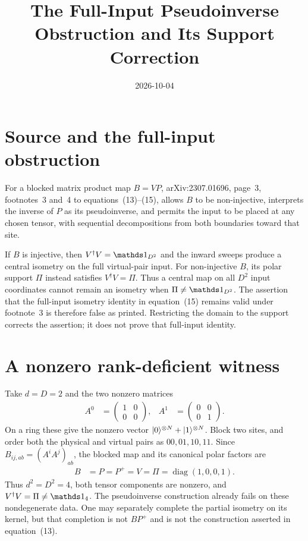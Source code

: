 \documentclass{article}
\title{The Full-Input Pseudoinverse Obstruction and Its Support Correction}
\author{}
\date{2026-10-04}
\begin{document}
\maketitle
{}

\section{Source and the full-input obstruction}
For a blocked matrix product map $B=VP$,
arXiv:2307.01696, page~3, footnotes~3 and~4 to equations~(13)--(15),
allows $B$ to be non-injective, interprets the inverse of $P$ as its
pseudoinverse, and permits the input to be placed at any chosen tensor,
with sequential decompositions from both boundaries toward that site.

If $B$ is injective, then $V^\dagger V=\Id_{D^2}$ and the inward sweeps
produce a central isometry on the full virtual-pair input.
For non-injective $B$, its polar support $\Pi$ instead satisfies
$V^\dagger V=\Pi$. Thus a central map on all $D^2$ input coordinates
cannot remain an isometry when $\Pi\ne\Id_{D^2}$.
The assertion that the full-input isometry identity in equation~(15)
remains valid under footnote~3 is therefore false as printed. Restricting
the domain to the support corrects the assertion; it does not prove that
full-input identity.

\section{A nonzero rank-deficient witness}
Take $d=D=2$ and the two nonzero matrices
\begin{align}
    A^0 & =\begin{pmatrix}1&0\\0&0\end{pmatrix}, &
    A^1 & =\begin{pmatrix}0&0\\0&1\end{pmatrix}.
    \label{eq:mswc24_ghz_tensor}
\end{align}
On a ring these give the nonzero vector $|0\rangle^{\otimes N}+|1\rangle^{\otimes N}$.
Block two sites, and order both the physical and virtual pairs as
$00,01,10,11$. Since $B_{ij,ab}=(A^iA^j)_{ab}$, the blocked map and its
canonical polar factors are
\begin{align}
    B & =P=P^+=V=\Pi=\operatorname{diag}(1,0,0,1).
    \label{eq:mswc24_ghz_polar}
\end{align}
Thus $d^2=D^2=4$, both tensor components are nonzero, and
$V^\dagger V=\Pi\ne\Id_4$. The pseudoinverse construction already fails
on these nondegenerate data. One may separately complete the partial
isometry on its kernel, but that completion is not $BP^+$ and is not the
construction asserted in equation~(13).
\end{document}
